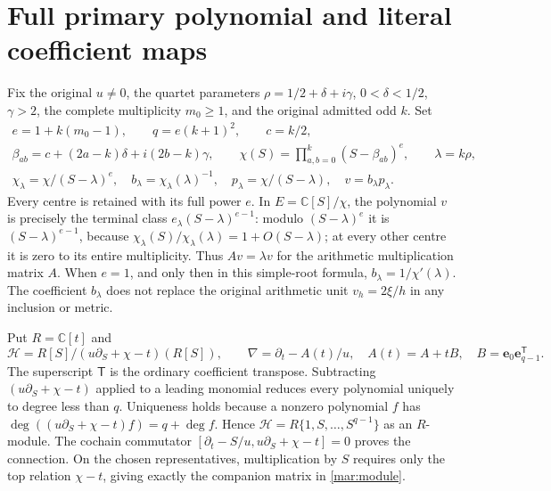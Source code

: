 \documentclass[11pt]{article}
\newcommand{\CC}{\mathbb C}
\begin{document}
\section{Full primary polynomial and literal coefficient maps}
Fix the original $u\ne0$, the quartet parameters
$\rho=1/2+\delta+i\gamma$, $0<\delta<1/2$, $\gamma>2$, the
complete multiplicity $m_0\ge1$, and the original admitted odd $k$.
Set
\begin{equation}\tag{MAR1}\label{mar:objects}
 \begin{gathered}
 e=1+k(m_0-1),\qquad q=e(k+1)^2,\qquad c=k/2,\\
 \beta_{ab}=c+(2a-k)\delta+i(2b-k)\gamma,\qquad
 \chi(S)=\prod_{a,b=0}^{k}(S-\beta_{ab})^e,\qquad\lambda=k\rho,\\
 \chi_\lambda=\chi/(S-\lambda)^e,\quad
 b_\lambda=\chi_\lambda(\lambda)^{-1},\quad
 p_\lambda=\chi/(S-\lambda),\quad v=b_\lambda p_\lambda.
 \end{gathered}
\end{equation}
Every centre is retained with its full power $e$. In $E=\CC[S]/\chi$,
the polynomial $v$ is precisely the terminal class
$e_\lambda(S-\lambda)^{e-1}$: modulo $(S-\lambda)^e$ it is
$(S-\lambda)^{e-1}$, because
$\chi_\lambda(S)/\chi_\lambda(\lambda)=1+O(S-\lambda)$;
at every other centre it is zero to its entire multiplicity.
Thus $A v=\lambda v$ for the arithmetic multiplication matrix $A$.
When $e=1$, and only then in this simple-root formula,
$b_\lambda=1/\chi'(\lambda)$. The coefficient $b_\lambda$ does not
replace the original arithmetic unit $v_h=2\xi/h$ in any inclusion or metric.

Put $R=\CC[t]$ and
\begin{equation}\tag{MAR2}\label{mar:module}
 \mathscr H=R[S]/(u\partial_S+\chi-t)(R[S]),\qquad
 \nabla=\partial_t-A(t)/u,
 \quad A(t)=A+tB,\quad B=\mathbf e_0\mathbf e_{q-1}^{\mathsf T}.
\end{equation}
The superscript $\mathsf T$ is the ordinary coefficient transpose.
Subtracting $(u\partial_S+\chi-t)$ applied to a leading monomial
reduces every polynomial uniquely to degree less than $q$. Uniqueness
holds because a nonzero polynomial $f$ has
$\deg((u\partial_S+\chi-t)f)=q+\deg f$. Hence
$\mathscr H=R\{1,S,\ldots,S^{q-1}\}$ as an $R$-module.
The cochain commutator
$[\partial_t-S/u,u\partial_S+\chi-t]=0$ proves the connection.
On the chosen representatives, multiplication by $S$ requires only
the top relation $\chi-t$, giving exactly the companion matrix in
\eqref{mar:module}.
\end{document}
